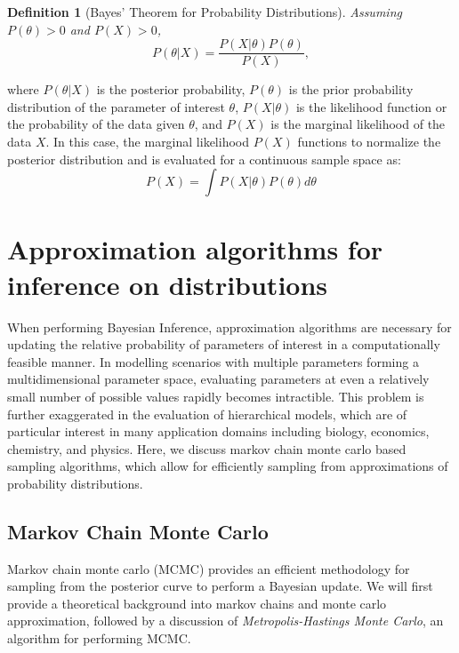 \documentclass[
  12pt,
]{book}
\theoremstyle{definition}
\newtheorem{definition}{Definition}[chapter]
\theoremstyle{definition}
\theoremstyle{definition}
\theoremstyle{remark}
\begin{document}
\begin{definition}[Bayes' Theorem for Probability Distributions]
\protect\hypertarget{def:bayesprob}{}{\label{def:bayesprob} {} }\emph{Assuming \(P(\theta)>0\) and \(P(X)>0\),}
\[P(\theta|X)=\frac{P(X|\theta)P(\theta)}{P(X)},\]
\end{definition}
where \(P(\theta|X)\) is the posterior probability, \(P(\theta)\) is the prior probability distribution of the parameter of interest \(\theta\), \(P(X|\theta)\) is the likelihood function or the probability of the data given \(\theta\), and \(P(X)\) is the marginal likelihood of the data \(X\).
In this case, the marginal likelihood \(P(X)\) functions to normalize the posterior distribution and is evaluated for a continuous sample space as:
\[P(X)=\int P(X|\theta)P(\theta)d\theta\]

\hypertarget{approximation-algorithms-for-inference-on-distributions}{%
\chapter{Approximation algorithms for inference on distributions}\label{approximation-algorithms-for-inference-on-distributions}}

When performing Bayesian Inference, approximation algorithms are necessary for updating the relative probability of parameters of interest in a computationally feasible manner.
In modelling scenarios with multiple parameters forming a multidimensional parameter space, evaluating parameters at even a relatively small number of possible values rapidly becomes intractible.
This problem is further exaggerated in the evaluation of hierarchical models, which are of particular interest in many application domains including biology, economics, chemistry, and physics.
Here, we discuss markov chain monte carlo based sampling algorithms, which allow for efficiently sampling from approximations of probability distributions.

\hypertarget{markov-chain-monte-carlo}{%
\section{Markov Chain Monte Carlo}\label{markov-chain-monte-carlo}}

Markov chain monte carlo (MCMC) provides an efficient methodology for sampling from the posterior curve to perform a Bayesian update. We will first provide a theoretical background into markov chains and monte carlo approximation, followed by a discussion of \emph{Metropolis-Hastings Monte Carlo}, an algorithm for performing MCMC.
\end{document}
